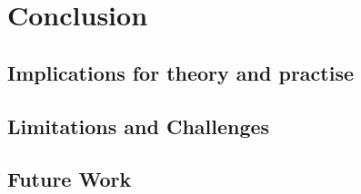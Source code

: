 %
\chapter{Conclusion}

\section{Implications for theory and practise}

\section{Limitations and Challenges}

\section{Future Work}